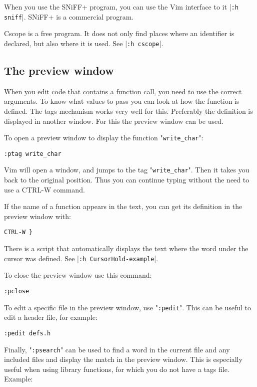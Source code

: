 When you use the SNiFF+ program, you can use the Vim interface to it |\verb!:h sniff!|.
SNiFF+ is a commercial program.

Cscope is a free program.
It does not only find places where an identifier is declared, but also where it is used.
See |\verb!:h cscope!|.
\subsection{The preview window}
When you edit code that contains a function call, you need to use the correct arguments.
To know what values to pass you can look at how the function is defined.
The tags mechanism works very well for this.
Preferably the definition is displayed in another window.
For this the preview window can be used.

To open a preview window to display the function "\verb!write_char!":

\begin{Verbatim}[samepage=true]
 :ptag write_char
\end{Verbatim}

Vim will open a window, and jumps to the tag "\verb!write_char!".
Then it takes you back to the original position.
Thus you can continue typing without the need to use a CTRL-W command.

If the name of a function appears in the text, you can get its definition in the preview window with:

\begin{Verbatim}[samepage=true]
 CTRL-W }
\end{Verbatim}

There is a script that automatically displays the text where the word under the cursor was defined.
See |\verb!:h CursorHold-example!|.

To close the preview window use this command:

\begin{Verbatim}[samepage=true]
 :pclose
\end{Verbatim}

To edit a specific file in the preview window, use "\verb!:pedit!".
This can be useful to edit a header file, for example:

\begin{Verbatim}[samepage=true]
 :pedit defs.h
\end{Verbatim}

Finally, "\verb!:psearch!" can be used to find a word in the current file and any included files and display the match in the preview window.
This is especially useful when using library functions, for which you do not have a tags file.
Example:

